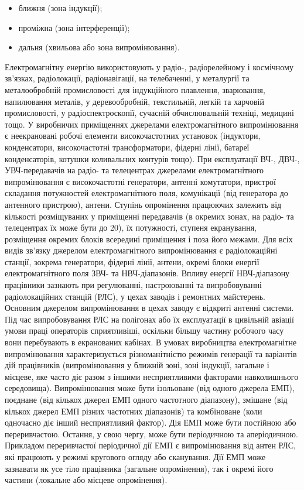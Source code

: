 \documentclass[14pt]{extarticle} %
\begin{document}
\begin{itemize}
	\item ближня (зона індукції);
    \item проміжна (зона інтерференції);
\item    дальня (хвильова або зона випромінювання).
\end{itemize}

Електромагнітну енергію використовують у радіо-, радіорелейному і космічному
зв'язках, радіолокації, радіонавігації, на телебаченні, у металургії та
металообробній промисловості для індукційного плавлення, зварювання,
напилювання металів, у деревообробній, текстильній, легкій та харчовій
промисловості, у радіоспектроскопії, сучасній обчислювальній техніці, медицині
тощо.
У виробничих приміщеннях джерелами електромагнітного випромінювання є
неекрановані робочі елементи високочастотних установок (індуктори,
конденсатори, високочастотні трансформатори, фідерні лінії, батареї
конденсаторів, котушки коливальних контурів тощо). При експлуатації ВЧ-, ДВЧ-,
УВЧ-передавачів на радіо- та телецентрах джерелами електромагнітного
випромінювання є високочастотні генератори, антенні комутатори, пристрої
складання потужностей електромагнітного поля, комунікації (від генератора до
антенного пристрою), антени.
Ступінь опромінення працюючих залежить від кількості розміщуваних у приміщенні
передавачів (в окремих зонах, на радіо- та телецентрах їх може бути до 20), їх
потужності, ступеня екранування, розміщення окремих блоків всередині приміщення
і поза його межами.
Для всіх видів зв'язку джерелом електромагнітного випромінювання є
радіолокаційні станції, зокрема генератори, фідерні лінії, антени, окремі блоки
енергії електромагнітного поля ЗВЧ- та НВЧ-діапазонів.
Впливу енергії НВЧ-діапазону працівники зазнають при регулюванні, настроюванні
та випробовуванні радіолокаційних станцій (РЛС), у цехах заводів і ремонтних
майстерень. Основним джерелом випромінювання в цехах заводу є відкриті антенні
системи. Під час випробовування РЛС на полігонах або їх експлуатації в
цивільній авіації умови праці операторів сприятливіші, оскільки більшу частину
робочого часу вони перебувають в екранованих кабінах.
В умовах виробництва електромагнітне випромінювання характеризується
різноманітністю режимів генерації та варіантів дій працівників (випромінювання
у ближній зоні, зоні індукції, загальне і місцеве, яке часто діє разом з іншими
несприятливими факторами навколишнього середовища). Випромінювання може бути
ізольоване (від одного джерела ЕМП), поєднане (від кількох джерел ЕМП одного
частотного діапазону), змішане (від кількох джерел ЕМП різних частотних
діапазонів) та комбіноване (коли одночасно діє інший несприятливий фактор). Дія
ЕМП може бути постійною або переривчастою. Остання, у свою чергу, може бути
періодичною та аперіодичною. Прикладом переривчастої періодичної дії ЕМП є
випромінювання від антен РЛС, які працюють у режимі кругового огляду або
сканування. Дії ЕМП може зазнавати як усе тіло працівника (загальне
опромінення), так і окремі його частини (локальне або місцеве опромінення).
\end{document}
